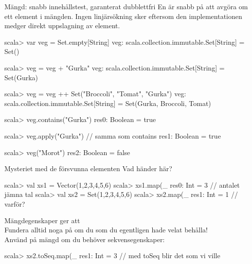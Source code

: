 \begin{Slide}{Mängd: snabb innehållstest, garanterat dubblettfri}\SlideFontSmall
En  är snabb på att avgöra om ett element  i mängden. Ingen linjärsökning sker eftersom den implementationen medger direkt uppslagning av element.

\begin{REPL}
scala> var veg = Set.empty[String]
veg: scala.collection.immutable.Set[String] = Set()

scala> veg = veg + "Gurka"
veg: scala.collection.immutable.Set[String] = Set(Gurka)

scala> veg = veg ++ Set("Broccoli", "Tomat", "Gurka")
veg: scala.collection.immutable.Set[String] = Set(Gurka, Broccoli, Tomat)

scala> veg.contains("Gurka")
res0: Boolean = true

scala> veg.apply("Gurka")   // samma som contains
res1: Boolean = true

scala> veg("Morot")
res2: Boolean = false
\end{REPL}

\end{Slide}



\begin{Slide}{Mysteriet med de försvunna elementen}
Vad händer här?
\begin{REPLnonum}
scala> val xs1 = Vector(1,2,3,4,5,6)
scala> xs1.map(_ %
res0: Int = 3                          // antalet jämna tal
scala> val xs2 = Set(1,2,3,4,5,6)
scala> xs2.map(_ %
res1: Int = 1                          // varför?
\end{REPLnonum}
\pause
Mängdegenskaper ger att \\
Fundera alltid noga på om du  som du egentligen hade velat behålla!\\
\pause
Använd  på mängd om du behöver sekvensegenskaper:
\begin{REPLnonum}
scala> xs2.toSeq.map(_ %
res1: Int = 3         // med toSeq blir det som vi ville
\end{REPLnonum}

\end{Slide}






